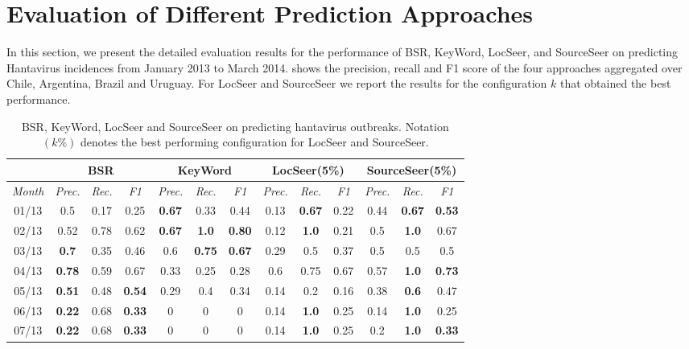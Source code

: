 \documentclass[twoside,leqno,twocolumn]{article}
\newcommand{\fullmodel}{{{\sf SourceSeer}}\xspace}
\newcommand{\locationmodel}{{\sf LocSeer}\xspace}
\newcommand{\keymodel}{{\sf KeyWord}\xspace}
\begin{document}
\section{ Evaluation of Different Prediction Approaches}
\label{sec:full_eval}
In this section, we present the detailed evaluation results for the performance of BSR, \keymodel, \locationmodel, and \fullmodel on predicting Hantavirus incidences from January 2013 to March 2014.  shows the precision, recall and F1 score  of the four approaches aggregated over Chile, Argentina, Brazil and Uruguay. For \locationmodel and \fullmodel we report the results for the configuration $k$ that obtained the best performance. 

\begin{table}[ht]
\scriptsize \centering
\captionsetup{font=scriptsize}
  \caption{BSR, \keymodel, \locationmodel and \fullmodel on predicting hantavirus outbreaks. Notation $(k\% )$ denotes the best performing configuration for \locationmodel and \fullmodel. }
  \begin{tabular}{|c|c|c|c|c|c|c|c|c|c|c|c|c|}
    \hline
    & \multicolumn{3}{c|}{{\bf BSR}} &
    \multicolumn{3}{c|}{{\bf \keymodel}} &
    \multicolumn{3}{c|}{{\bf \locationmodel(5\%)}} &
    \multicolumn{3}{c|}{{\bf \fullmodel(5\%)}} \\
    \hline
    \cline{2-10} {\em Month}   & {\em Prec.} & {\em Rec.} & {\em F1} & {\em Prec.} & {\em Rec.} & {\em F1} & {\em Prec.} & {\em Rec.} & {\em F1} & {\em Prec.} & {\em Rec.} & {\em F1} \\
    \hline 
    01/13 & 0.5 & 0.17 & 0.25 & {\bf 0.67}& 0.33& 0.44& 0.13 & {\bf 0.67} & 0.22 & 0.44 & {\bf 0.67} & {\bf 0.53}\\ 
    \hline
     02/13 & 0.52 & 0.78 & 0.62 & {\bf 0.67} & {\bf 1.0}& {\bf 0.80} & 0.12 & {\bf 1.0} & 0.21 & 0.5 & {\bf 1.0} & 0.67\\ 
    \hline
    03/13 & {\bf 0.7} & 0.35 & 0.46 & 0.6 & {\bf 0.75} & {\bf 0.67} & 0.29 & 0.5 & 0.37 & 0.5 & 0.5 & 0.5\\ 
    \hline
    04/13 & {\bf 0.78} & 0.59 & 0.67 & 0.33  & 0.25  & 0.28 & 0.6 & 0.75 & 0.67 & 0.57 & {\bf 1.0} & {\bf 0.73}\\ 
    \hline
    05/13 & {\bf 0.51} & 0.48 & {\bf 0.54} & 0.29 & 0.4 & 0.34& 0.14 & 0.2 & 0.16 & 0.38 & {\bf 0.6} & 0.47\\ 
    \hline
    06/13 & {\bf 0.22} & 0.68 & {\bf 0.33} & 0& 0& 0& 0.14 & {\bf 1.0} & 0.25 & 0.14 & {\bf 1.0} & 0.25\\ 
    \hline
    07/13 & {\bf 0.22} & 0.68 & {\bf 0.33} & 0& 0& 0& 0.14 & {\bf 1.0} & 0.25 & 0.2 & {\bf 1.0} & {\bf 0.33}\\ 

\end{tabular}
\end{table}
\end{document}
